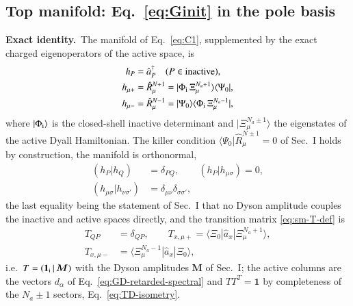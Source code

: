 \documentclass[aip,jcp,reprint,noshowkeys,superscriptaddress]{revtex4-1}
\newcommand{\bM}{\boldsymbol{M}}
\newcommand{\Exact}{\textbf{Exact identity.}\ }
\begin{document}
\subsection{Top manifold: Eq.~\eqref{eq:Ginit} in the pole basis}
\label{sec:sm-top}

\Exact The manifold of Eq.~\eqref{eq:C1}, supplemented by the exact
charged eigenoperators of the active space, is
\begin{align}
  h_P&=\hat a_P^\dagger\quad(P\in\text{inactive}),
  \label{eq:sm-hP}\\
  h_{\mu+}&=\hat R^{N+1}_\mu=|\Phi_{\rm i}\,\Xi^{N_a+1}_\mu\rangle\langle\Psi_0| ,
  \label{eq:sm-hmu}\\
  h_{\mu-}&=\hat R^{N-1}_\mu=|\Psi_0\rangle\langle\Phi_{\rm i}\,\Xi^{N_a-1}_\mu| ,
  \nonumber
\end{align}
where $|\Phi_{\rm i}\rangle$ is the closed-shell inactive determinant and
$|\Xi^{N_a\pm1}_\mu\rangle$ the eigenstates of the active Dyall Hamiltonian.
The killer condition $\langle\Psi_0|\hat R^{N\pm1}_\mu=0$ of Sec.~I holds by
construction, the manifold is orthonormal,
\begin{align}
  (h_P|h_Q)&=\delta_{PQ},\qquad (h_P|h_{\mu\sigma})=0 ,
  \label{eq:sm-metric}\\
  (h_{\mu\sigma}|h_{\nu\sigma'})&=\delta_{\mu\nu}\delta_{\sigma\sigma'},\nonumber
\end{align}
the last equality being the statement of Sec.~I that no Dyson amplitude
couples the inactive and active spaces directly, and the transition matrix
\eqref{eq:sm-T-def} is
\begin{align}
  T_{QP}&=\delta_{QP},\qquad
  T_{x,\mu+}=\langle\Xi_0|\hat a_x|\Xi^{N_a+1}_\mu\rangle,
  \label{eq:sm-T}\\
  T_{x,\mu-}&=\langle\Xi^{N_a-1}_\mu|\hat a_x|\Xi_0\rangle ,\nonumber
\end{align}
i.e.\ $T=(\mathbf 1_{\rm i}\,|\,\bM)$ with the Dyson amplitudes $\bM$ of
Sec.~I; the active columns are the vectors $d_\alpha$ of
Eq.~\eqref{eq:GD-retarded-spectral} and $TT^{T}=\mathbf 1$ by completeness of
the $N_a\pm1$ sectors, Eq.~\eqref{eq:TD-isometry}.
\end{document}
